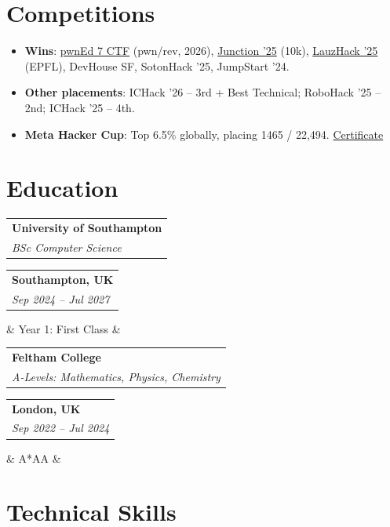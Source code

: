 \documentclass[10pt,a4paper,sans]{moderncv}
\makeatletter
\newcommand*{\customcventry}[7][.05em]{
\begin{tabular}{@{}l}
{\bfseries #4} \\
{\itshape #3}
\end{tabular}
\hfill
\begin{tabular}{l@{}}
{\bfseries #5} \\
{\itshape #2}
\end{tabular}
\ifx&#7&%
\else{\\
\begin{minipage}{\maincolumnwidth}%
\small#7%
\end{minipage}}\fi%
\par\addvspace{#1}}
\makeatother
\begin{document}

\section{Competitions}

\begin{itemize}
    \item \textbf{Wins}: 
    \href{https://www.linkedin.com/posts/arjunjuneja_hi-just-won-pwned-7-a-ctf-ran-by-the-amazing-share-7438996490213064704-VwRX}{pwnEd 7 CTF}
    (pwn/rev, 2026),
    \href{https://www.linkedin.com/posts/arjunjuneja_hi-again-i-just-won-one-of-europes-biggest-activity-7395862662816952321-cJR1}{Junction '25}
    (\texteuro10k),
    \href{https://www.linkedin.com/posts/arjunjuneja_hi-again-yes-its-the-2nd-win-in-a-week-activity-7398432080323375104-Kj4x}{LauzHack '25}
    (EPFL), DevHouse SF, SotonHack '25, JumpStart '24.

    \item \textbf{Other placements}: ICHack '26 -- 3rd + Best Technical; RoboHack '25 -- 2nd; ICHack '25 -- 4th.

    \item \textbf{Meta Hacker Cup}: Top 6.5\% globally, placing 1465 / 22,494.
    \href{https://www.facebook.com/codingcompetitions/hacker-cup/2024/certificate/968836085258124}{Certificate}
\end{itemize}

\section{Education}

\customcventry{Sep 2024 -- Jul 2027}{BSc Computer Science}{University of Southampton}{Southampton, UK}{}{
Year 1: First Class
}

\vspace{1.5mm}

\customcventry{Sep 2022 -- Jul 2024}{A-Levels: Mathematics, Physics, Chemistry}{Feltham College}{London, UK}{}{
A*AA
}

\section{Technical Skills}

\end{document}
